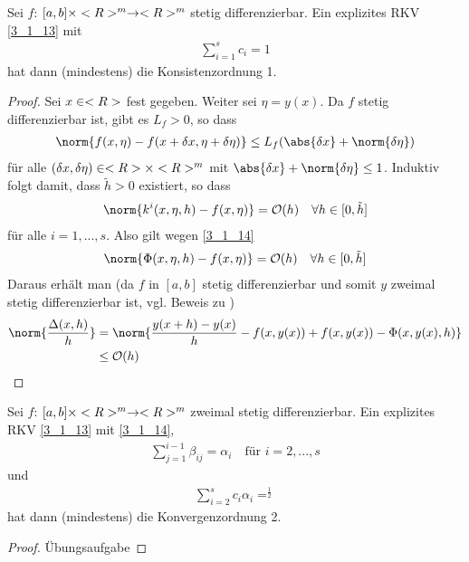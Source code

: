 \begin{proposition}
	Sei $f$: $[a,b]\times <R>^m\to<R>^m$ stetig differenzierbar. Ein explizites RKV \cref{3_1_13} mit 
	\begin{align}
		\label{3_1_14}
		\sum_{i=1}^s c_i=1
	\end{align}
	hat dann (mindestens) die Konsistenzordnung 1.
\end{proposition}
\begin{proof}
	Sei $x\in<R>$ fest gegeben. Weiter sei $\eta=y(x)$. Da $f$ stetig differenzierbar ist, gibt es $L_f>0$, so dass
	\begin{align}
		\norm{f(x,\eta) - f(x+\delta x,\eta + \delta\eta)} \le L_f(\abs{\delta x} + \norm{\delta\eta}) \notag
	\end{align}
	für alle $(\delta x,\delta\eta)\in<R>\times<R>^m$ mit $\abs{\delta x} + \norm{\delta\eta}\le 1$. Induktiv folgt damit, dass $\tilde{h}>0$ existiert, so dass
	\begin{align}
		\norm{k^i(x,\eta,h) - f(x,\eta)} = \mathcal{O}(h) \quad\forall h\in [0,\tilde{h}] \notag
	\end{align}
	für alle $i=1,...,s$. Also gilt wegen \cref{3_1_14}
	\begin{align}
		\norm{\Phi(x,\eta,h) - f(x,\eta)} = \mathcal{O}(h) \quad\forall h\in [0,\tilde{h}] \notag
	\end{align}
	Daraus erhält man (da $f$ in $[a,b]$ stetig differenzierbar und somit $y$ zweimal stetig differenzierbar ist, vgl. Beweis zu )
	\begin{align}
		\norm{\frac{\Delta(x,h)}{h}} &= \norm{\frac{y(x+h) - y(x)}{h} - f(x,y(x)) + f(x,y(x)) - \Phi(x,y(x),h)} \notag \\
		&\le \mathcal{O}(h) \notag
	\end{align}
\end{proof}

\begin{proposition}
	Sei $f$: $[a,b]\times<R>^m\to<R>^m$ zweimal stetig differenzierbar. Ein explizites RKV \cref{3_1_13} mit \cref{3_1_14},
	\begin{align}
		\label{3_1_15}
		\sum_{j=1}^{i-1}\beta_{ij}=\alpha_i\quad\text{für } i=2,...,s
	\end{align}
	und
	\begin{align}
		\label{3_1_16}
		\sum_{i=2}^s c_i\alpha_i = ^\frac{1}{2}
	\end{align}
	hat dann (mindestens) die Konvergenzordnung 2.
\end{proposition}
\begin{proof}
	Übungsaufgabe
\end{proof}

